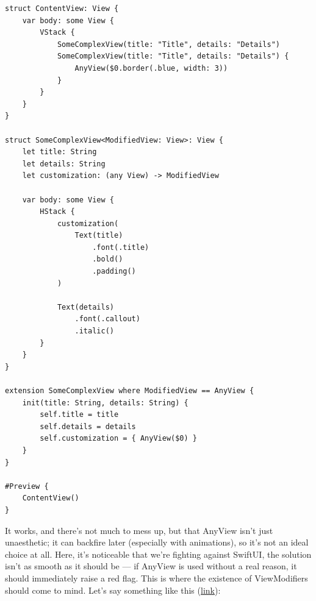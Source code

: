 \documentclass{article}
\begin{document}
\begin{lstlisting}
struct ContentView: View {
    var body: some View {
        VStack {
            SomeComplexView(title: "Title", details: "Details")
            SomeComplexView(title: "Title", details: "Details") {
                AnyView($0.border(.blue, width: 3))
            }
        }
    }
}

struct SomeComplexView<ModifiedView: View>: View {
    let title: String
    let details: String
    let customization: (any View) -> ModifiedView

    var body: some View {
        HStack {
            customization(
                Text(title)
                    .font(.title)
                    .bold()
                    .padding()
            )

            Text(details)
                .font(.callout)
                .italic()
        }
    }
}

extension SomeComplexView where ModifiedView == AnyView {
    init(title: String, details: String) {
        self.title = title
        self.details = details
        self.customization = { AnyView($0) }
    }
}

#Preview {
    ContentView()
}
\end{lstlisting}

It works, and there’s not much to mess up, but that AnyView isn’t just unaesthetic; it can backfire later (especially with animations), so it’s not an ideal choice at all. Here, it’s noticeable that we’re fighting against SwiftUI, the solution isn’t as smooth as it should be — if AnyView is used without a real reason, it should immediately raise a red flag. This is where the existence of ViewModifiers should come to mind. Let’s say something like this (\href{https://github.com/stateman92/Medium-ViewModifier/commit/3dddd22f9279f45f08d9c830b4884a20044fe2ac}{link}):
\end{document}
